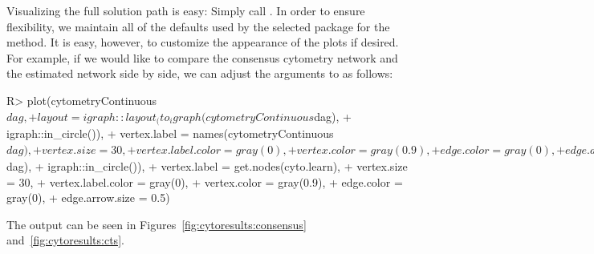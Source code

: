 \documentclass[article]{jss}
\renewcommand{\|}{\,|\,}
\begin{document}
Visualizing the full solution path is easy: Simply call . In order to ensure flexibility, we maintain all of the defaults used by the selected package for the  method. It is easy, however, to customize the appearance of the plots if desired. For example, if we would like to compare the consensus cytometry network and the estimated network side by side, we can adjust the arguments to  as follows:
%
\begin{CodeChunk}
\begin{CodeInput}
R> plot(cytometryContinuous$dag,
+    layout = igraph::layout_(to_igraph(cytometryContinuous$dag), 
+                          igraph::in_circle()),
+    vertex.label = names(cytometryContinuous$dag),
+    vertex.size = 30,
+    vertex.label.color = gray(0),
+    vertex.color = gray(0.9),
+    edge.color = gray(0),
+    edge.arrow.size = 0.5)
R> plot(cyto.learn[[selected.lambda]],
+    layout = igraph::layout_(to_igraph(cytometryContinuous$dag), 
+                             igraph::in_circle()),
+    vertex.label = get.nodes(cyto.learn),
+    vertex.size = 30,
+    vertex.label.color = gray(0),
+    vertex.color = gray(0.9),
+    edge.color = gray(0),
+    edge.arrow.size = 0.5)
\end{CodeInput}
\end{CodeChunk}
%
The output can be seen in Figures~\ref{fig:cytoresults:consensus} and~\ref{fig:cytoresults:cts}.
\end{document}
